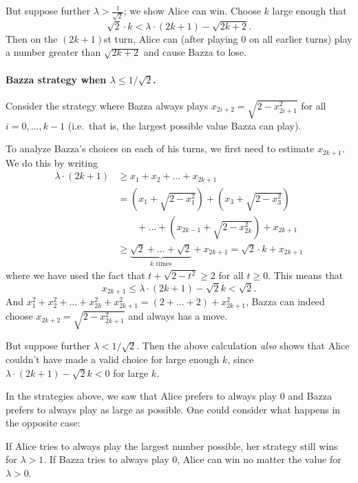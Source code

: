 \documentclass[11pt]{scrartcl}
\begin{document}
But suppose further $\lambda > \frac{1}{\sqrt 2}$; we show Alice can win.
Choose $k$ large enough that
\[ \sqrt{2} \cdot k < \lambda \cdot (2k+1) - \sqrt{2k+2}. \]
Then on the $(2k+1)$st turn, Alice can (after playing $0$ on all earlier turns)
play a number greater than $\sqrt{2k+2}$ and cause Bazza to lose.

\paragraph{Bazza strategy when $\lambda \le 1/\sqrt2$.}
Consider the strategy where Bazza always plays $x_{2i+2} = \sqrt{2 - x_{2i+1}^2}$
for all $i = 0, \dots, k-1$ (i.e.\ that is, the largest possible value Bazza can play).

To analyze Bazza's choices on each of his turns, we first need to estimate $x_{2k+1}$.
We do this by writing
\begin{align*}
  \lambda \cdot (2k+1) &\ge x_1 + x_2 + \dots + x_{2k+1} \\
  &= \left(x_1 + \sqrt{2-x_1^2}\right) + \left(x_3 + \sqrt{2-x_3^2}\right) \\
  &\qquad+ \dots + \left(x_{2k-1} + \sqrt{2-x_{2k}^2}\right) + x_{2k+1} \\
  &\ge {\underbrace{\sqrt{2} + \dots + \sqrt{2}}_{k \text{ times}}} + x_{2k+1}
  = \sqrt 2 \cdot k + x_{2k+1}
\end{align*}
where we have used the fact that $t + \sqrt{2-t^2} \ge 2$ for all $t \ge 0$.
This means that
\[ x_{2k+1} \le \lambda \cdot (2k+1) - \sqrt 2 k < \sqrt 2. \]
And $x_1^2 + x_2^2 + \dots + x_{2k}^2 + x_{2k+1}^2 = (2 + \dots + 2) + x_{2k+1}^2$,
Bazza can indeed choose $x_{2k+2} = \sqrt{2-x_{2k+1}^2}$ and always has a move.

But suppose further $\lambda < 1/\sqrt2$.
Then the above calculation \emph{also} shows that Alice couldn't
have made a valid choice for large enough $k$,
since $\lambda \cdot (2k+1) - \sqrt 2 k < 0$ for large $k$.

\begin{remark*}
  In the strategies above,
  we saw that Alice prefers to always play $0$
  and Bazza prefers to always play as large as possible.
  One could consider what happens in the opposite case:
  \begin{itemize}
    \ii If Alice tries to always play the largest number possible,
    her strategy still wins for $\lambda > 1$.
    \ii If Bazza tries to always play $0$,
    Alice can win no matter the value for $\lambda > 0$.
  \end{itemize}
\end{remark*}
\pagebreak
\end{document}
